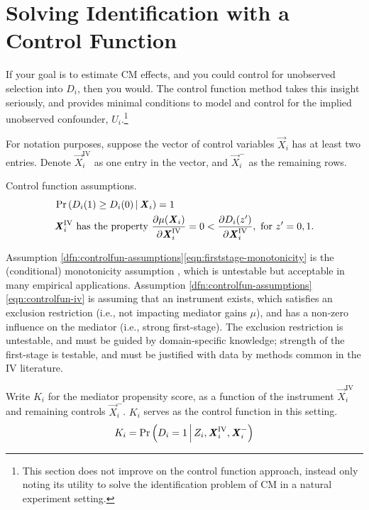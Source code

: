 \section{Solving Identification with a Control Function}
\label{sec:controlfun}
If your goal is to estimate CM effects, and you could control for unobserved selection into $D_i$, then you would.
The control function method takes this insight seriously, and provides minimal conditions to model and control for the implied unobserved confounder, $U_i$.\footnote{
    This section does not improve on the control function approach, instead only noting its utility to solve the identification problem of CM in a natural experiment setting.
}

For notation purposes, suppose the vector of control variables $\vec X_i$ has at least two entries.
Denote $\vec X_i^{\text{IV}}$ as one entry in the vector, and $\vec X_i^-$ as the remaining rows.

\begin{definition}
    \label{dfn:controlfun-assumptions}
    Control function assumptions.
    \begin{align}
        \label{eqn:firststage-monotonicity}
        &\Probgiven{ D_i(1) \geq D_i(0) }{\vec X_i} = 1    \\
        \label{eqn:controlfun-iv}
        &\vec X_i^{\text{IV}} \text{ has the property }
        \partialdiff[\mu(\vec X_i)]{\vec X_i^{\text{IV}}} = 0 < \partialdiff[D_i(z')]{\vec X_i^{\text{IV}}}, \textnormal{ for } z' = 0, 1.
    \end{align}
\end{definition}
Assumption \ref{dfn:controlfun-assumptions}\eqref{eqn:firststage-monotonicity} is the (conditional) monotonicity assumption \citep{imbens1994identification}, which is untestable but acceptable in many empirical applications.
Assumption \ref{dfn:controlfun-assumptions}\eqref{eqn:controlfun-iv} is assuming that an instrument exists, which satisfies an exclusion restriction (i.e., not impacting mediator gains $\mu$), and has a non-zero influence on the mediator (i.e., strong first-stage).
The exclusion restriction is untestable, and must be guided by domain-specific knowledge; strength of the first-stage is testable, and must be justified with data by methods common in the IV literature.

Write $K_i$ for the mediator propensity score, as a function of the instrument $\vec X_i^{\text{IV}}$ and remaining controls $\vec X_i^-$.
$K_i$ serves as the control function in this setting.
\[ K_i = \Pr\left( D_i = 1 \, \middle\vert \, Z_i, \boldsymbol{\mathit{X}}_i^{\text{IV}}, \boldsymbol{\mathit{X}}_i^- \right) \]

